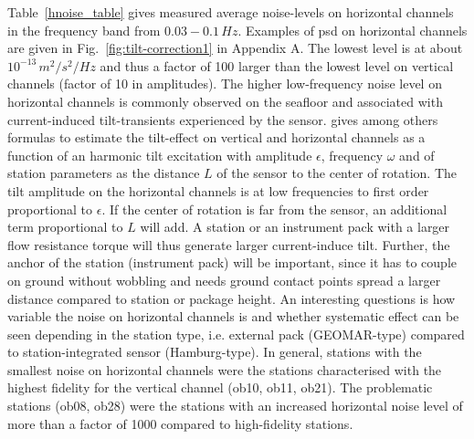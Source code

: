 \documentclass{article}
\begin{document}
{%
%
%
Table~\ref{hnoise_table} gives 
measured average noise-levels on horizontal channels in the 
frequency band from $0.03 - 0.1\, Hz$. 
Examples of psd on horizontal channels are given in 
Fig.~\ref{fig:tilt-correction1} in Appendix A.
The lowest level is at about $10^{-13}\, m^2/s^2 / Hz$
and thus a factor of 100 larger than the lowest level on 
vertical channels (factor of 10 in amplitudes).
The higher low-frequency noise level on horizontal channels is  
commonly observed on the seafloor and associated with 
current-induced tilt-transients experienced by the sensor.
\cite{duennebier:95,crawford:00} gives among others 
formulas to estimate the tilt-effect on vertical and horizontal channels
as a function of an harmonic tilt excitation with amplitude $\epsilon$,
frequency $\omega$ and of station parameters as the 
distance $L$ of the sensor to the center of rotation.
The tilt amplitude on the horizontal channels is at low frequencies to
first order proportional to $\epsilon$. 
If the center of rotation is far from the sensor, an additional 
term proportional to $L$ will add.
A station or an instrument pack with a larger flow resistance torque
will thus generate larger current-induce tilt.
Further, the anchor of the station (instrument pack) 
will be important, since 
it has to couple on ground without wobbling 
and needs ground contact points spread a larger distance compared to 
station or package height. 
An interesting questions is how variable the noise 
on horizontal channels is and whether systematic 
effect can be seen depending in the station type,
i.e. external pack (GEOMAR-type) compared to 
station-integrated sensor (Hamburg-type). 
In general, stations with the smallest noise on horizontal channels 
were the stations characterised with the highest fidelity 
for the vertical channel (ob10, ob11, ob21).
The problematic stations (ob08, ob28) were the stations with an increased 
horizontal noise level of more than a factor of 1000 compared to high-fidelity stations. 
}
\end{document}
